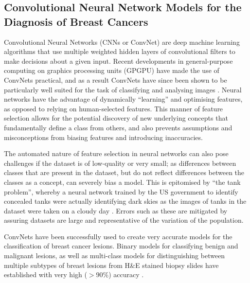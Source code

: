 \subsection{Convolutional Neural Network Models for the Diagnosis of Breast Cancers}

Convolutional Neural Networks (CNNs or ConvNet) are deep machine learning algorithms that use multiple weighted hidden layers of convolutional filters to make decisions about a given input. Recent developments in general-purpose computing on graphics processing units (GPGPU) have made the use of ConvNets practical, and as a result ConvNets have since been shown to be particularly well suited for the task of classifying and analysing images \citep{ciresan2011, ciresan2012}. Neural networks have the advantage of dynamically ``learning'' and optimising features, as opposed to relying on human-selected features. This manner of feature selection allows for the potential discovery of new underlying concepts that fundamentally define a class from others, and also prevents assumptions and misconceptions from biasing features and introducing inaccuracies.\par

The automated nature of feature selection in neural networks can also pose challenges if the dataset is of low-quality or very small; as differences between classes that are present in the dataset, but do not reflect differences between the classes as a concept, can severely bias a model. This is epitomised by ``the tank problem'', whereby a neural network trained by the US government to identify concealed tanks were actually identifying dark skies as the images of tanks in the dataset were taken on a cloudy day \citep{dreyfus1992}. Errors such as these are mitigated by assuring datasets are large and representative of the variation of the population.\par

ConvNets have been successfully used to create very accurate models for the classification of breast cancer lesions. Binary models for classifying benign and malignant lesions, as well as multi-class models for distinguishing between multiple subtypes of breast lesions from H\&E stained biopsy slides have established with very high ($>90\%$) accuracy \citep{wei2017, han2017}.  



